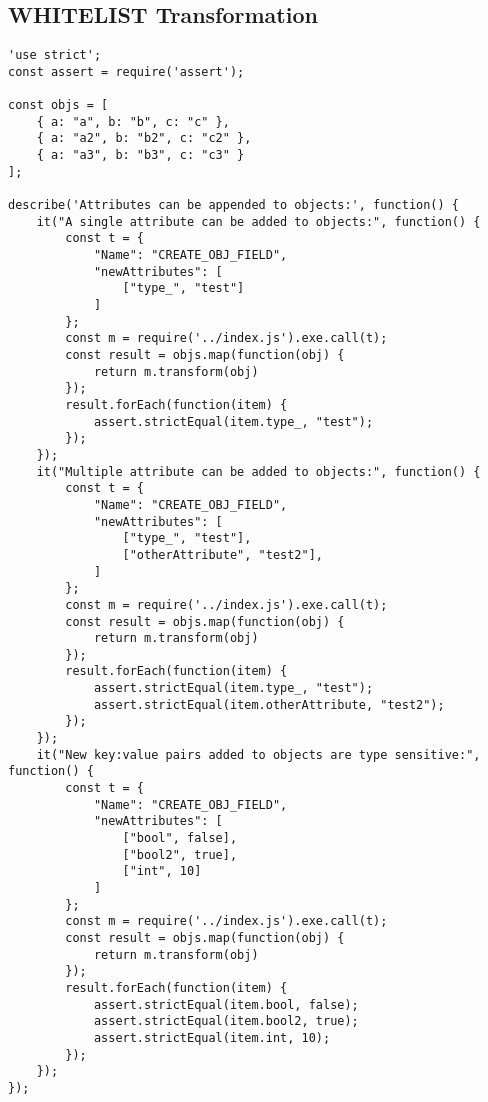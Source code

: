 \subsection{WHITELIST Transformation}
\label{WHITELIST-tests}
\begin{verbatim}
'use strict';
const assert = require('assert');

const objs = [
    { a: "a", b: "b", c: "c" },
    { a: "a2", b: "b2", c: "c2" },
    { a: "a3", b: "b3", c: "c3" }
];

describe('Attributes can be appended to objects:', function() {
    it("A single attribute can be added to objects:", function() {
        const t = {
            "Name": "CREATE_OBJ_FIELD",
            "newAttributes": [
                ["type_", "test"]
            ]
        };
        const m = require('../index.js').exe.call(t);
        const result = objs.map(function(obj) {
            return m.transform(obj)
        });
        result.forEach(function(item) {
            assert.strictEqual(item.type_, "test");
        });
    });
    it("Multiple attribute can be added to objects:", function() {
        const t = {
            "Name": "CREATE_OBJ_FIELD",
            "newAttributes": [
                ["type_", "test"],
                ["otherAttribute", "test2"],
            ]
        };
        const m = require('../index.js').exe.call(t);
        const result = objs.map(function(obj) {
            return m.transform(obj)
        });
        result.forEach(function(item) {
            assert.strictEqual(item.type_, "test");
            assert.strictEqual(item.otherAttribute, "test2");
        });
    });
    it("New key:value pairs added to objects are type sensitive:", function() {
        const t = {
            "Name": "CREATE_OBJ_FIELD",
            "newAttributes": [
                ["bool", false],
                ["bool2", true],
                ["int", 10]
            ]
        };
        const m = require('../index.js').exe.call(t);
        const result = objs.map(function(obj) {
            return m.transform(obj)
        });
        result.forEach(function(item) {
            assert.strictEqual(item.bool, false);
            assert.strictEqual(item.bool2, true);
            assert.strictEqual(item.int, 10);
        });
    });
});
\end{verbatim}